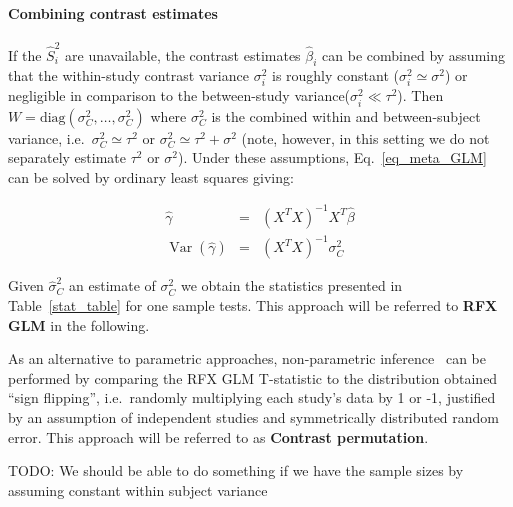\documentclass{llncs}
\DeclareMathOperator{\Var}{Var}
\newcommand{\effectvector}{\hat\beta}
\newcommand{\effect}[1][i]{\effectvector_{#1}}
\newcommand{\vareffect}[1][i]{\hat S^2_{#1}}
\newcommand{\varCombined}{\sigma^2_{C}}
\newcommand{\estvarCombined}{\hat\sigma^2_{C}}
\newcommand{\metaanalyticeffect}{\gamma}
\newcommand{\varBetween}{\tau^2}
\newcommand{\varWithinCommon}{\sigma^2}
\newcommand{\varWithin}[1][i]{\sigma^2_{#1}}
\newcommand{\transpose}{^T}
\begin{document}
\paragraph{Combining contrast estimates}
If the $\vareffect$ are unavailable, the contrast estimates $\effect$ can be combined by assuming that the within-study contrast variance $\varWithin$ is roughly constant ($\varWithin \simeq \sigma^2$) or negligible in comparison to the between-study variance($\varWithin \ll \varBetween$). Then $W = \mathrm{diag}( \varCombined, \ldots, \varCombined )$ where $\varCombined$ is the combined within and between-subject variance, i.e.\ $\varCombined \simeq \varBetween$ or $\varCombined \simeq \varBetween + \varWithinCommon$ (note, however, in this setting we do not separately estimate $\varBetween$ or $\varWithinCommon$). Under these assumptions, Eq.~\eqref{eq_meta_GLM} can be solved by ordinary least squares giving:

\begin{eqnarray}
	\hat \metaanalyticeffect  &=& (X\transpose X)^{-1} X\transpose \effectvector \\
	\Var(\hat \metaanalyticeffect)  &=& (X\transpose X)^{-1} \varCombined
	\label{eq_OLS}
\end{eqnarray}

Given $\estvarCombined$ an estimate of $\varCombined$ we obtain the statistics presented in Table~\ref{stat_table} for one sample tests. This approach will be referred to \textbf{RFX GLM} in the following.

As an alternative to parametric approaches, non-parametric inference~\cite{Holmes1996,Nichols2002} can be performed by comparing the RFX GLM T-statistic to the distribution obtained ``sign flipping'', i.e.\ randomly multiplying each study's data by 1 or -1, justified by an assumption of independent studies and symmetrically distributed random error. This approach will be referred to as \textbf{Contrast permutation}.

TODO: We should be able to do something if we have the sample sizes by assuming constant within subject variance
\end{document}

